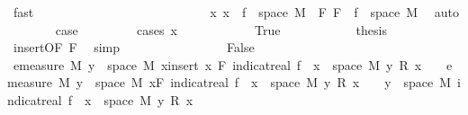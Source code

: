 \begin{isabellebody}
\ fast\isanewline
\ \ \ \ \ \ \isamarkupfalse%
\isanewline
\ \ \ \ \isamarkupfalse%
\isanewline
\ \ \ \ \ \ \isamarkupfalse%
\ {}\isanewline
\ \ \ \ \ \ \isamarkupfalse%
\ x{\isacharcolon}{\kern0pt}\ {\isachardoublequoteopen}x\ {\isasymin}\ f\ {\isacharbackquote}{\kern0pt}\ space\ M{\isachardoublequoteclose}\ \ F{\isacharcolon}{\kern0pt}\ {\isachardoublequoteopen}F\ {\isasymsubseteq}\ f\ {\isacharbackquote}{\kern0pt}\ space\ M{\isachardoublequoteclose}\ \isamarkupfalse%
\ auto\isanewline
\ \ \ \ \ \ \isamarkupfalse%
\ {\isacharquery}{\kern0pt}case\ \isanewline
\ \ \ \ \ \ \isamarkupfalse%
\ {\isacharparenleft}{\kern0pt}cases\ {\isachardoublequoteopen}x\ {\isacharequal}{\kern0pt}\ {}{\isachardoublequoteclose}{\isacharparenright}{\kern0pt}\isanewline
\ \ \ \ \ \ \ \ \isamarkupfalse%
\ True\isanewline
\ \ \ \ \ \ \ \ \isamarkupfalse%
\ \isamarkupfalse%
\ {\isacharquery}{\kern0pt}thesis\ \isamarkupfalse%
\ {\isacharasterisk}{\kern0pt}\ \isamarkupfalse%
\ insert{\isacharparenleft}{\kern0pt}{}{\isacharparenright}{\kern0pt}{\isacharbrackleft}{\kern0pt}OF\ F{\isacharbrackright}{\kern0pt}\ \isamarkupfalse%
\ simp\isanewline
\ \ \ \ \ \ \isamarkupfalse%
\isanewline
\ \ \ \ \ \ \ \ \isamarkupfalse%
\ False\isanewline
\ \ \ \ \ \ \ \ \isamarkupfalse%
\ {\isachardoublequoteopen}emeasure\ M\ {\isacharbraceleft}{\kern0pt}y\ {\isasymin}\ space\ M{\isachardot}{\kern0pt}\ {\isacharparenleft}{\kern0pt}{\isasymSum}x{\isasymin}insert\ x\ F{\isachardot}{\kern0pt}\ indicat{\isacharunderscore}{\kern0pt}real\ {\isacharparenleft}{\kern0pt}f\ {\isacharminus}{\kern0pt}{\isacharbackquote}{\kern0pt}\ {\isacharbraceleft}{\kern0pt}x{\isacharbraceright}{\kern0pt}\ {\isasyminter}\ space\ M{\isacharparenright}{\kern0pt}\ y\ {\isacharasterisk}{\kern0pt}\isactrlsub R\ x{\isacharparenright}{\kern0pt}\ {\isasymnoteq}\ {}{\isacharbraceright}{\kern0pt}\ {\isasymle}\ emeasure\ M\ {\isacharparenleft}{\kern0pt}{\isacharbraceleft}{\kern0pt}y\ {\isasymin}\ space\ M{\isachardot}{\kern0pt}\ {\isacharparenleft}{\kern0pt}{\isasymSum}x{\isasymin}F{\isachardot}{\kern0pt}\ indicat{\isacharunderscore}{\kern0pt}real\ {\isacharparenleft}{\kern0pt}f\ {\isacharminus}{\kern0pt}{\isacharbackquote}{\kern0pt}\ {\isacharbraceleft}{\kern0pt}x{\isacharbraceright}{\kern0pt}\ {\isasyminter}\ space\ M{\isacharparenright}{\kern0pt}\ y\ {\isacharasterisk}{\kern0pt}\isactrlsub R\ x{\isacharparenright}{\kern0pt}\ {\isasymnoteq}\ {}{\isacharbraceright}{\kern0pt}\ {\isasymunion}\ {\isacharbraceleft}{\kern0pt}y\ {\isasymin}\ space\ M{\isachardot}{\kern0pt}\ indicat{\isacharunderscore}{\kern0pt}real\ {\isacharparenleft}{\kern0pt}f\ {\isacharminus}{\kern0pt}{\isacharbackquote}{\kern0pt}\ {\isacharbraceleft}{\kern0pt}x{\isacharbraceright}{\kern0pt}\ {\isasyminter}\ space\ M{\isacharparenright}{\kern0pt}\ y\ {\isacharasterisk}{\kern0pt}\isactrlsub R\ x\ {\isasymnoteq}\ {}{\isacharbraceright}{\kern0pt}{\isacharparenright}{\kern0pt}{\isachardoublequoteclose}\isanewline

\end{isabellebody}
